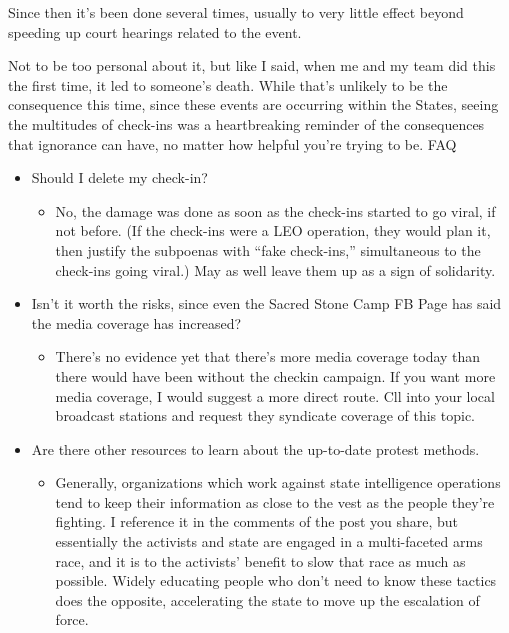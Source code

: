 \documentclass[11pt]{article}
\begin{document}
\begin{itemize}
Since then it’s been done several times, usually to very little effect beyond speeding up court hearings related to the event.

Not to be too personal about it, but like I said, when me and my team did this the first time, it led to someone’s death. While that’s unlikely to be the consequence this time, since these events are occurring within the States, seeing the multitudes of check-ins was a heartbreaking reminder of the consequences that ignorance can have, no matter how helpful you’re trying to be.
FAQ

\begin{itemize}
\item Should I delete my check-in?
\begin{itemize}
\item No, the damage was done as soon as the check-ins started to go viral, if not before. (If the check-ins were a LEO operation, they would plan it, then justify the subpoenas with “fake check-ins,” simultaneous to the check-ins going viral.) May as well leave them up as a sign of solidarity.
\end{itemize}
\item Isn’t it worth the risks, since even the Sacred Stone Camp FB Page has said the media coverage has increased?
\begin{itemize}
\item There’s no evidence yet that there’s more media coverage today than there would have been without the checkin campaign. If you want more media coverage, I would suggest a more direct route. Cll into your local broadcast stations and request they syndicate coverage of this topic.
\end{itemize}
\item Are there other resources to learn about the up-to-date protest methods.
\begin{itemize}
\item Generally, organizations which work against state intelligence operations tend to keep their information as close to the vest as the people they’re fighting. I reference it in the comments of the post you share, but essentially the activists and state are engaged in a multi-faceted arms race, and it is to the activists’ benefit to slow that race as much as possible. Widely educating people who don’t need to know these tactics does the opposite, accelerating the state to move up the escalation of force.
\end{itemize}
\end{itemize}
\end{itemize}
\stopcontents[level-4]
\end{document}
